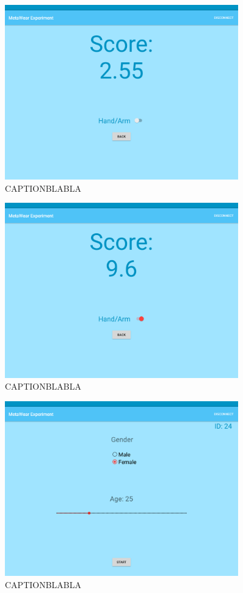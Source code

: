 \begin{figure}[h!]
\centering
\includegraphics[width=0.9\textwidth]{figures/tablet_screen3.png}
\caption{CAPTIONBLABLA}
\label{appendix_app_screen_3}
\end{figure}

\begin{figure}[h!]
\centering
\includegraphics[width=0.9\textwidth]{figures/tablet_screen4.png}
\caption{CAPTIONBLABLA}
\label{appendix_app_screen_4}
\end{figure}

\begin{figure}[h!]
\centering
\includegraphics[width=0.9\textwidth]{figures/tablet_screen5.png}
\caption{CAPTIONBLABLA}
\label{appendix_app_screen_5}
\end{figure}

